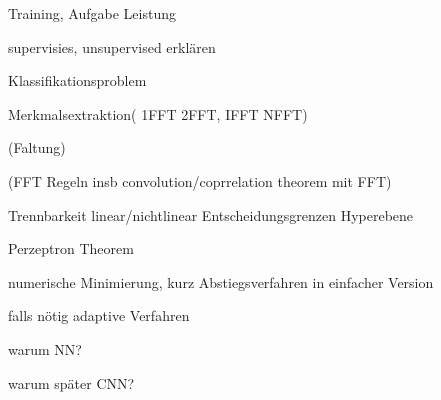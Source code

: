 Training, Aufgabe Leistung

supervisies, unsupervised erklären

Klassifikationsproblem

Merkmalsextraktion( 1FFT 2FFT, IFFT NFFT)

(Faltung)

(FFT Regeln insb convolution/coprrelation theorem mit FFT)

Trennbarkeit linear/nichtlinear Entscheidungsgrenzen Hyperebene

Perzeptron Theorem

numerische Minimierung, kurz Abstiegsverfahren in einfacher Version

falls nötig adaptive Verfahren

warum NN?

warum später CNN?


